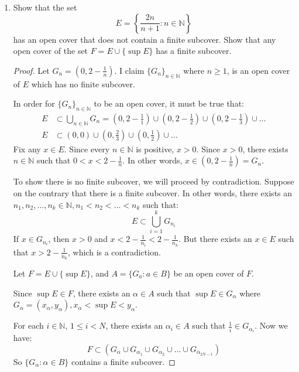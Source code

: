 \documentclass[12pt]{amsart}
\begin{document}
\begin{enumerate}
\item Show that the set 
%
\[ E = \left\{ \frac{2n}{n+1} : n \in \mathbb{N}\right\} \]
%
has an open cover that does not contain a finite subcover.  Show that any open cover of the set $F=E\cup \{\sup E\}$ has a finite subcover.
\begin{proof}
Let $G_n = (0, 2-\frac 1 n)$. I claim $\{G_n\}_{n\in\mathbb N}$ where $n\ge 1$, is an open cover of $E$ which has no finite subcover.

In order for $\{G_n\}_{n\in\mathbb N}$ to be an open cover, it must be true that:
\begin{align*}
E &\subset \bigcup_{n\in\mathbb N} G_n = \left(0,2-\frac 1 1\right)\cup\left(0,2-\frac 1 2\right)\cup\left(0,2-\frac 1 3\right)\cup\ldots \\
E &\subset \left(0,0\right)\cup\left(0,\frac 2 3\right)\cup\left(0,\frac 1 2\right)\cup\ldots
\end{align*}
Fix any $x\in E$. Since every $n\in\mathbb N$ is positive, $x>0$. Since $x>0$, there exists $n\in\mathbb N$ such that $0<x<2-\frac 1 n$. In other words, $x\in(0,2-\frac 1 n) = G_n$.

To show there is no finite subcover, we will proceed by contradiction. Suppose on the contrary that there is a finite subcover. In other words, there exists an $n_1, n_2, \ldots, n_k\in\mathbb N, n_1<n_2<\ldots<n_k$ such that:
\[ E \subset \bigcup_{i=1}^k G_{n_i} \]
If $x\in G_{n_i}$, then $x>0$ and $x<2-\frac 1 {n_i} < 2-\frac 1 {n_k}$. But there exists an $x\in E$ such that $x>2-\frac 1 {n_k}$, which is a contradiction.

\bigskip

Let $F = E\cup \{\sup E\}$, and $A=\{G_a : a \in B\}$ be an open cover of $F$. 

Since $\sup E\in F$, there exists an $\alpha\in A$ such that $\sup E \in G_\alpha$ where $G_\alpha=(x_\alpha,y_\alpha), x_\alpha < \sup E < y_\alpha$. %

For each $i\in\mathbb N$, $1\le i < N$, there exists an $\alpha_i\in A$ such that $\frac 1 i \in G_{\alpha_i}$. Now we have:
\[ F \subset (G_\alpha \cup G_{\alpha_1} \cup G_{\alpha_2} \cup \ldots \cup G_{\alpha_{2N-1}}) \]
So $\{G_\alpha : \alpha\in B \}$ contains a finite subcover.
\end{proof}

\end{enumerate} 
\end{document}

